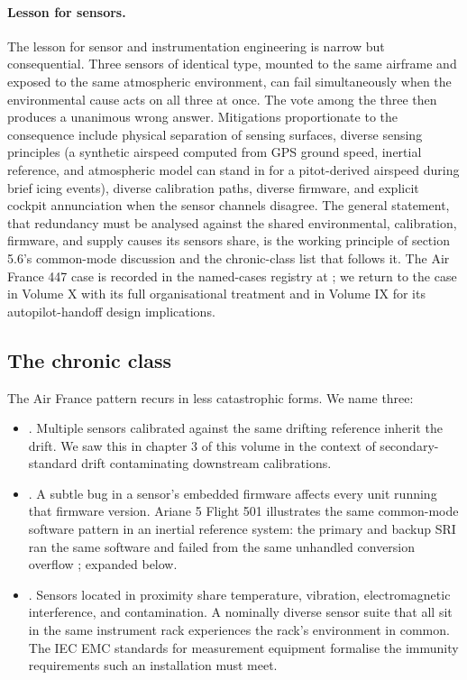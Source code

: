 \paragraph{Lesson for sensors.} The lesson for sensor and
instrumentation engineering is narrow but consequential. Three
sensors of identical type, mounted to the same airframe and exposed
to the same atmospheric environment, can fail simultaneously when
the environmental cause acts on all three at once. The vote among
the three then produces a unanimous wrong answer. Mitigations
proportionate to the consequence include physical separation of
sensing surfaces, diverse sensing principles (a synthetic
airspeed computed from GPS ground speed, inertial reference, and
atmospheric model can stand in for a pitot-derived airspeed during
brief icing events), diverse calibration paths, diverse firmware,
and explicit cockpit annunciation when the sensor channels
disagree. The general statement, that redundancy must be analysed
against the shared environmental, calibration, firmware, and supply
causes its sensors share, is the working principle of section 5.6's
common-mode discussion and the chronic-class list that follows it.
The Air France 447 case is recorded in the named-cases registry at
; we return
to the case in Volume X with its full organisational treatment and
in Volume IX for its autopilot-handoff design implications.

\subsection{The chronic class}

The Air France pattern recurs in less catastrophic forms. We name
three:

\begin{itemize}[leftmargin=*]
  \item {}. Multiple sensors
    calibrated against the same drifting reference inherit the
    drift. We saw this in chapter 3 of this volume in the context
    of secondary-standard drift contaminating downstream
    calibrations.
  \item {}. A subtle bug in a sensor's
    embedded firmware affects every unit running that firmware
    version. Ariane 5 Flight 501 illustrates the same common-mode
    software pattern in an inertial reference system: the primary
    and backup SRI ran the same software and failed from the same
    unhandled conversion overflow \cite{acc:ariane501-ifr};
    expanded below.
  \item {}. Sensors located in proximity
    share temperature, vibration, electromagnetic interference,
    and contamination. A nominally diverse sensor suite that all
    sit in the same instrument rack experiences the rack's
    environment in common. The IEC EMC standards for measurement
    equipment \cite{std:ch05-iec-61326-2013} formalise the
    immunity requirements such an installation must meet.
\end{itemize}

